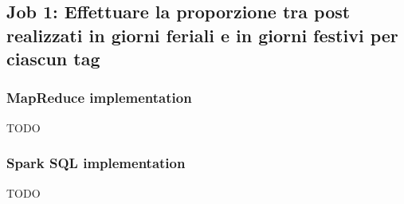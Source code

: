 

\subsection[%
    Job 1: Proporzione giorni feriali/festivi per tag%
  ]{%
    Job 1: Effettuare la proporzione tra post realizzati in giorni feriali e in giorni festivi per ciascun tag%
  }\label{subsec:job1}

  \subsubsection{MapReduce implementation}\label{subsub:job1:mapreduce}

  TODO

  \subsubsection{Spark SQL implementation}\label{subsub:job1:spark}

  TODO
